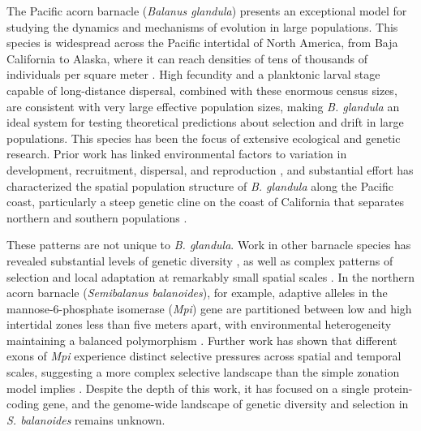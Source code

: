 \documentclass[11pt]{article}
\newcommand{\balgla}{\textit{Balanus glandula}\xspace}
\newcommand{\bgla}{\textit{B. glandula}\xspace}
\begin{document}
The Pacific acorn barnacle (\balgla) presents an exceptional model for studying the
dynamics and mechanisms of evolution in large populations. This species is widespread
across the Pacific intertidal of North America, from Baja California to Alaska,
where it can reach densities of tens of thousands of individuals per square meter
\citep{menge_recruitment_2000}. High fecundity and a planktonic larval stage capable
of long-distance dispersal, combined with these enormous census sizes, are consistent
with very large effective population sizes, making \bgla{} an ideal system for
testing theoretical predictions about selection and drift in large populations. This
species has been the focus of extensive ecological and genetic research. Prior work
has linked environmental factors to variation in development, recruitment, dispersal,
and reproduction \citep{berger_spatial_2006,berger_reproduction_2009,
barshis_coastal_2011,pfeiffer-hoyt_modeling_2005,schubart_recruitment_1995}, and
substantial effort has characterized the spatial population structure of \bgla{}
along the Pacific coast, particularly a steep genetic cline on the coast of
California that separates northern and southern populations
\citep{sotka_strong_2004,wares_diversification_2005,wares_maintenance_2019,
wares_diversity_2021}.
\vspace{0.2cm}

These patterns are not unique to \bgla{}. Work in other barnacle
species has revealed substantial levels of genetic diversity
\citep{alm_rosenblad_genomic_2021}, as well as complex patterns of selection and
local adaptation at remarkably small spatial scales \citep{nunez_footprints_2020,
nunez_tides_2021}. In the northern acorn barnacle (\textit{Semibalanus balanoides}),
for example, adaptive alleles in the mannose-6-phosphate isomerase (\textit{Mpi}) gene
are partitioned between low and high intertidal zones less than five meters apart,
with environmental heterogeneity maintaining a balanced polymorphism
\citep{schmidt_environmental_2000,nunez_footprints_2020}. Further work has shown that
different exons of \textit{Mpi} experience distinct selective pressures across spatial
and temporal scales, suggesting a more complex selective landscape than the simple
zonation model implies \citep{nunez_tides_2021}. Despite the depth of this work, it
has focused on a single protein-coding gene, and the genome-wide landscape of genetic
diversity and selection in \textit{S. balanoides} remains unknown.
\vspace{0.2cm}
\end{document}

